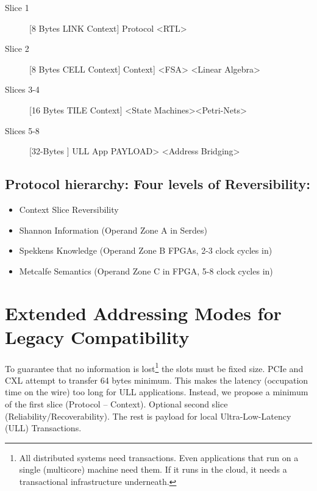\documentclass[../HFT-main.tex]{subfiles}
\begin{document}
\begin{description}
	\item [Slice 1] [8 Bytes LINK Context] Protocol  <RTL> 
	\item [Slice 2] [8 Bytes CELL Context]  Context]   <FSA>  <Linear Algebra>
	\item [Slices 3-4] [16 Bytes TILE Context] <State Machines><Petri-Nets>%
	\item [Slices 5-8] [32-Bytes ] ULL App PAYLOAD> <Address Bridging> 
\end{description}

\subsection{Protocol hierarchy:  Four levels of Reversibility:}

\begin{itemize}
\item Context Slice Reversibility 
\item Shannon Information (Operand Zone A in Serdes)
\item Spekkens Knowledge (Operand Zone B  FPGAs, 2-3 clock cycles in)
\item Metcalfe Semantics (Operand Zone C in FPGA, 5-8 clock cycles in)
\end{itemize}

\section{Extended Addressing Modes for Legacy Compatibility}

To guarantee that no information is lost\footnote[][-50mm]{All distributed systems need transactions. Even applications that run on a single (multicore) machine need them.  If it runs in the cloud, it needs a transactional infrastructure underneath.}%
the slots must be fixed size.  PCIe and CXL attempt to transfer 64 bytes minimum.  This makes the latency (occupation time on the wire) too long for ULL applications. Instead, we propose a minimum of the first slice (Protocol  -- Context).  Optional second slice  (Reliability/Recoverability). The rest is payload for local Ultra-Low-Latency (ULL) Transactions.
\end{document}
